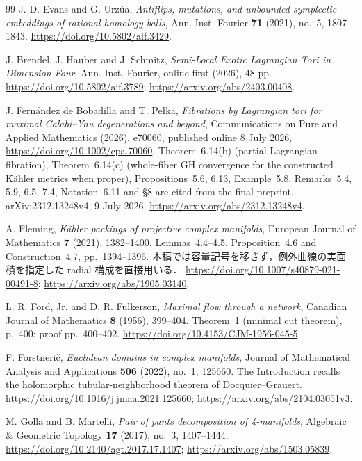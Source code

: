 \begin{thebibliography}{99}
J. D. Evans and G. Urz\'ua,
\emph{Antiflips, mutations, and unbounded symplectic embeddings of rational homology balls},
Ann. Inst. Fourier \textbf{71} (2021), no.~5, 1807--1843.
\url{https://doi.org/10.5802/aif.3429}.

J. Brendel, J. Hauber and J. Schmitz,
\emph{Semi-Local Exotic Lagrangian Tori in Dimension Four},
Ann. Inst. Fourier, online first (2026), 48 pp.
\url{https://doi.org/10.5802/aif.3789};
\url{https://arxiv.org/abs/2403.00408}.

J. Fernández de Bobadilla and T. Pełka,
\emph{Fibrations by Lagrangian tori for maximal Calabi--Yau degenerations and beyond},
Communications on Pure and Applied Mathematics (2026), e70060,
published online 8 July 2026,
\url{https://doi.org/10.1002/cpa.70060}.
Theorem~6.14(b) (partial Lagrangian fibration),
Theorem~6.14(c) (whole-fiber GH convergence for the constructed Kähler metrics when proper),
Propositions~5.6, 6.13, Example~5.8, Remarks~5.4, 5.9, 6.5, 7.4,
Notation~6.11 and \S8 are cited from the final preprint,
arXiv:2312.13248v4, 9 July 2026.
\url{https://arxiv.org/abs/2312.13248v4}.

A. Fleming,
\emph{Kähler packings of projective complex manifolds},
European Journal of Mathematics \textbf{7} (2021), 1382--1400.
Lemmas~4.4--4.5, Proposition~4.6 and Construction~4.7, pp.~1394--1396.
本稿では容量記号を移さず，例外曲線の実面積を指定した radial 構成を直接用いる．
\url{https://doi.org/10.1007/s40879-021-00491-8};
\url{https://arxiv.org/abs/1905.03140}.

L. R. Ford, Jr. and D. R. Fulkerson,
\emph{Maximal flow through a network},
Canadian Journal of Mathematics \textbf{8} (1956), 399--404.
Theorem~1 (minimal cut theorem), p.~400; proof pp.~400--402.
\url{https://doi.org/10.4153/CJM-1956-045-5}.

F. Forstnerič,
\emph{Euclidean domains in complex manifolds},
Journal of Mathematical Analysis and Applications \textbf{506} (2022), no.~1, 125660.
The Introduction recalls the holomorphic tubular-neighborhood theorem of Docquier--Grauert.
\url{https://doi.org/10.1016/j.jmaa.2021.125660};
\url{https://arxiv.org/abs/2104.03051v3}.

M. Golla and B. Martelli,
\emph{Pair of pants decomposition of 4-manifolds},
Algebraic \& Geometric Topology \textbf{17} (2017), no.~3, 1407--1444.
\url{https://doi.org/10.2140/agt.2017.17.1407};
\url{https://arxiv.org/abs/1503.05839}.


\end{thebibliography}
